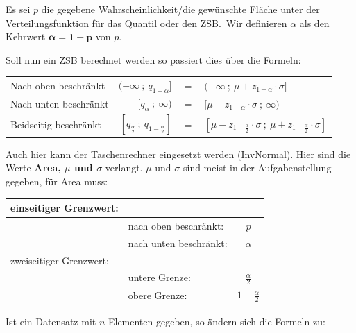 \documentclass[twoside, a4paper]{report}
\begin{document}
Es sei \(p\) die gegebene Wahrscheinlichkeit/die gewünschte Fläche unter der Verteilungsfunktion für das Quantil oder den ZSB.\ Wir definieren \(\alpha\) als den Kehrwert \(\mathbf{\alpha = 1 - p}\) von \(p\).

Soll nun ein ZSB berechnet werden so passiert dies über die Formeln:

\begin{center}
  \begin{tabular}{lrcl}
    \toprule
    Nach oben beschränkt & \((-\infty\ ;\ q_{1-\alpha}]\) & \(=\) & \((-\infty\ ;\ \mu + z_{1-\alpha} \cdot \sigma]\)\\
    Nach unten beschränkt & \([q_{\alpha}\ ;\ \infty)\) & \(=\) & \([\mu - z_{1- \alpha} \cdot \sigma\ ;\ \infty)\)\\
    Beidseitig beschränkt & \([q_{\frac{\alpha}{2}}\ ;\ q_{1-\frac{\alpha}{2}}]\) & \(=\) & \([\mu - z_{1-\frac{\alpha}{2}} \cdot \sigma\ ;\ \mu + z_{1-\frac{\alpha}{2}} \cdot \sigma]\)\\
    \bottomrule
  \end{tabular}
\end{center}

Auch hier kann der Taschenrechner eingesetzt werden (InvNormal). Hier sind die Werte \textbf{Area, $\mu$ und $\sigma$} verlangt. $\mu$ und $\sigma$ sind meist in der Aufgabenstellung gegeben, für Area muss:

\begin{center}
  \begin{tabular}{llc}
    \toprule
    einseitiger Grenzwert: &&\\
    \midrule
                           & nach oben beschränkt: & \(p\)\\
                           & nach unten beschränkt: & \(\alpha\)\\
    \midrule
    zweiseitiger Grenzwert: &&\\
    \midrule
                           & untere Grenze: & \(\frac{\alpha}{2}\)\\
                           & obere Grenze: & \(1-\frac{\alpha}{2}\)\\
    \bottomrule
  \end{tabular}
\end{center}

Ist ein Datensatz mit \(n\) Elementen gegeben, so ändern sich die Formeln zu:
\end{document}
